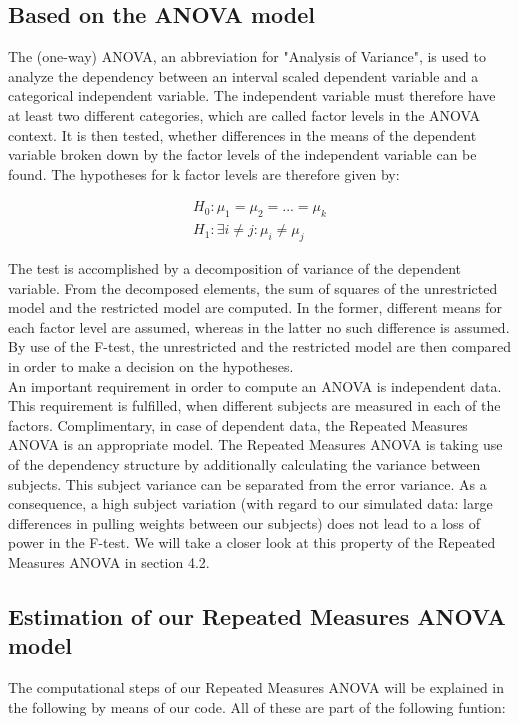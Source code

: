 \documentclass[11pt]{article}
\begin{document}
		\subsection{Based on the ANOVA model}
				 The (one-way) ANOVA, an abbreviation for "Analysis of Variance", is used to analyze the dependency between an interval scaled dependent variable and a categorical independent variable. The independent variable must therefore have at least two different categories, which are called factor levels in the ANOVA context. It is then tested, whether differences in the means of the dependent variable broken down by the factor levels of the independent variable can be found. The hypotheses for k factor levels are therefore given by:
			
		\begin{eqnarray*}
		H_{0}: {\mu_{1}} = {\mu_{2}} = ... = {\mu_{k}} \\
		H_{1}: \exists i \not= j: {\mu_{i}} \not= {\mu_{j}} 
		\end{eqnarray*} 

				 The test is accomplished by a decomposition of variance of the dependent variable. From the decomposed elements, the sum of squares of the unrestricted model and the restricted model are computed. In the former, different means for each factor level are assumed, whereas in the latter no such difference is assumed. By use of the F-test, the unrestricted and the restricted model are then compared in order to make a decision on the hypotheses.\\
				 
				 An important requirement in order to compute an ANOVA is independent data. This requirement is fulfilled, when different subjects are measured in each of the factors. Complimentary, in case of dependent data, the Repeated Measures ANOVA is an appropriate model. The Repeated Measures ANOVA is taking use of the dependency structure by additionally calculating the variance between subjects. This subject variance can be separated from the error variance. As a consequence, a high subject variation (with regard to our simulated data: large differences in pulling weights between our subjects) does not lead to a loss of power in the F-test. We will take a closer look at this property of the Repeated Measures ANOVA in section 4.2.

		\subsection{Estimation of our Repeated Measures ANOVA model}
				 The computational steps of our Repeated Measures ANOVA will be explained in the following by means of our code. All of these are part of the following funtion:\\
					
\end{document}
